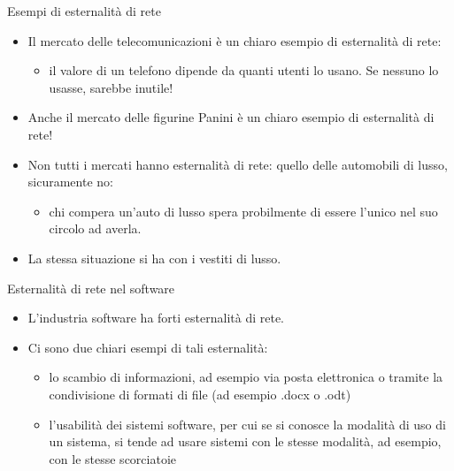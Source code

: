 \documentclass{beamer}
\begin{document}
\begin{frame}
{\centerline{Esempi di esternalit\`{a} di rete}}

\begin{itemize}
\item Il mercato delle telecomunicazioni \`{e} un chiaro esempio di esternalit\`{a} di rete: 
\begin{itemize}
\item il valore di un telefono dipende da quanti utenti lo usano. Se nessuno lo usasse, sarebbe inutile!
\end{itemize}
\item Anche il mercato delle figurine Panini \`{e} un chiaro esempio di esternalit\`{a} di rete!

\item Non tutti i mercati hanno esternalit\`{a} di rete: quello delle automobili di lusso, sicuramente no:
\begin{itemize}
\item chi compera un'auto di lusso spera probilmente di essere l'unico nel suo circolo ad averla.
\end{itemize}
\item La stessa situazione si ha con i vestiti di lusso.

\end{itemize}

\end{frame}

\begin{frame}
{\centerline{Esternalit\`{a} di rete nel software}}

\begin{itemize}
\item L'industria software ha forti esternalit\`{a} di rete.
\item Ci sono due chiari esempi di tali esternalit\`{a}:
\begin{itemize}
\item lo scambio di informazioni, ad esempio via posta elettronica o tramite la condivisione di formati di file (ad esempio .docx o .odt)
\item l'usabilit\`{a} dei sistemi software, per cui se si conosce la modalit\`{a} di uso di un sistema, si tende ad usare sistemi con le stesse modalit\`{a}, ad esempio, con le stesse scorciatoie
\end{itemize}

\end{itemize}

\end{frame}
\end{document}
